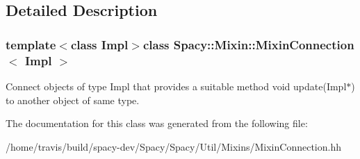\subsection{\-Detailed \-Description}
\subsubsection*{template$<$class \-Impl$>$class Spacy\-::\-Mixin\-::\-Mixin\-Connection$<$ Impl $>$}

\-Connect objects of type \-Impl that provides a suitable method void update(\-Impl$\ast$) to another object of same type. 

\-The documentation for this class was generated from the following file\-:\begin{DoxyCompactItemize}
\item 
/home/travis/build/spacy-\/dev/\-Spacy/\-Spacy/\-Util/\-Mixins/\-Mixin\-Connection.\-hh\end{DoxyCompactItemize}
